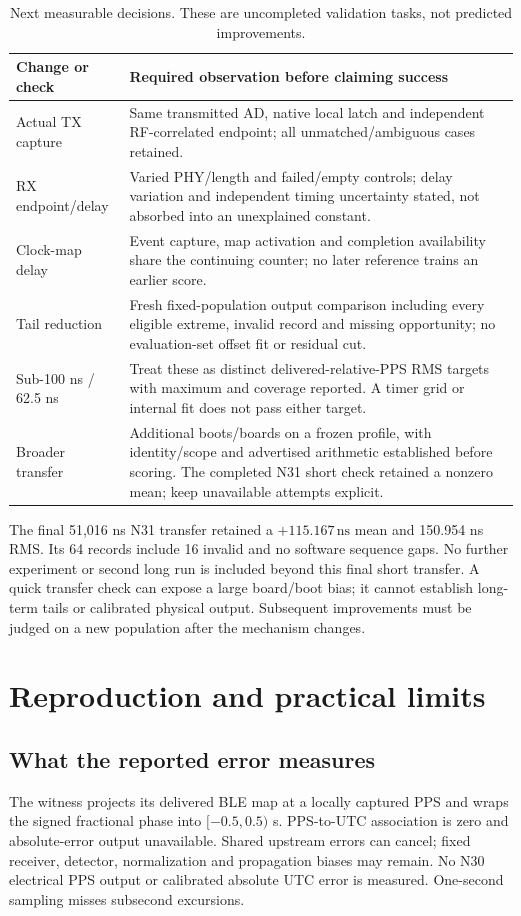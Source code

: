 \documentclass[10pt,letterpaper]{article}
\newcommand{\ns}{\,\mathrm{ns}}\newcommand{\us}{\,\mu\mathrm{s}}\newcommand{\code}[1]{\texttt{#1}}\newcolumntype{L}[1]{>{\RaggedRight\arraybackslash}p{#1}}\renewcommand{\arraystretch}{1.15}
\begin{document}
\begin{table}[ht]\centering\small
\caption{Next measurable decisions. These are uncompleted validation tasks, not predicted improvements.}
\begin{tabular}{L{33mm}L{112mm}}\toprule
Change or check & Required observation before claiming success\\\midrule
Actual TX capture &Same transmitted AD, native local latch and independent RF-correlated endpoint; all unmatched/ambiguous cases retained.\\
RX endpoint/delay &Varied PHY/length and failed/empty controls; delay variation and independent timing uncertainty stated, not absorbed into an unexplained constant.\\
Clock-map delay &Event capture, map activation and completion availability share the continuing counter; no later reference trains an earlier score.\\
Tail reduction &Fresh fixed-population output comparison including every eligible extreme, invalid record and missing opportunity; no evaluation-set offset fit or residual cut.\\
Sub-100 ns / 62.5 ns &Treat these as distinct delivered-relative-PPS RMS targets with maximum and coverage reported. A timer grid or internal fit does not pass either target.\\
Broader transfer &Additional boots/boards on a frozen profile, with identity/scope and advertised arithmetic established before scoring. The completed N31 short check retained a nonzero mean; keep unavailable attempts explicit.\\\bottomrule\end{tabular}\end{table}

The final 51,016 ns N31 transfer retained a $+115.167\ns$ mean and 150.954 ns RMS. Its 64 records include 16 invalid and no software sequence gaps. No further experiment or second long run is included beyond this final short transfer. A quick transfer check can expose a large board/boot bias; it cannot establish long-term tails or calibrated physical output. Subsequent improvements must be judged on a new population after the mechanism changes.
\newpage

\section{Reproduction and practical limits}\label{sec:limits}
\subsection{What the reported error measures}
The witness projects its delivered BLE map at a locally captured PPS and wraps the signed fractional phase into $[-0.5,0.5)$ s. PPS-to-UTC association is zero and absolute-error output unavailable. Shared upstream errors can cancel; fixed receiver, detector, normalization and propagation biases may remain. No N30 electrical PPS output or calibrated absolute UTC error is measured. One-second sampling misses subsecond excursions.
\end{document}
